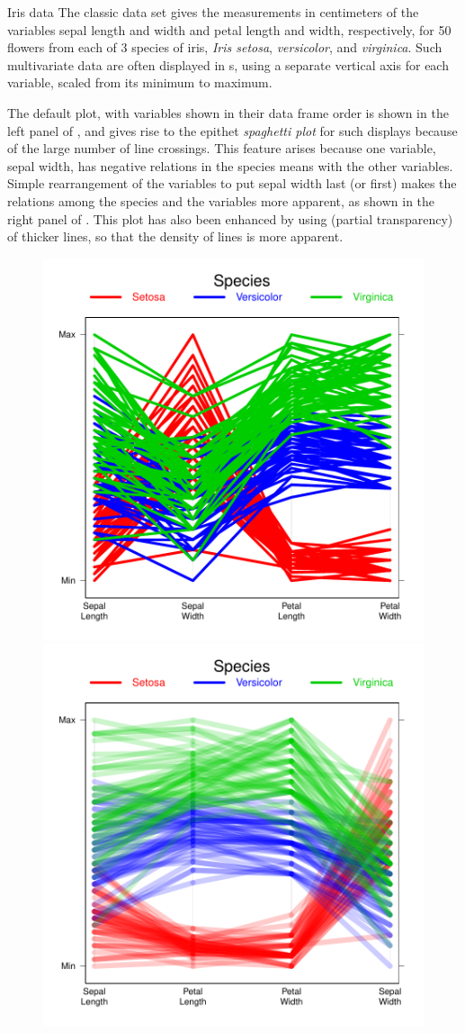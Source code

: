 \documentclass[10pt,krantz2]{krantz}\usepackage[]{graphicx}\usepackage[]{color}
\newenvironment{knitrout}{}{} %
\renewenvironment{knitrout}{\small\renewcommand{\baselinestretch}{.85}}{} %
\begin{document}
\begin{Example}{Iris data}
The classic  data set \citep{Anderson:35,Fisher:36}
gives the measurements in centimeters of the variables sepal length and width and petal length and width, respectively, for 50 flowers from each of 3 species of iris, \emph{Iris setosa}, \emph{versicolor}, and \emph{virginica}.
Such multivariate data are often displayed in s, using a separate vertical axis for
each variable, scaled from its minimum to maximum.

The default plot, with variables shown in their data frame order is shown in the left panel of ,
and gives rise to the epithet \emph{spaghetti plot} for such displays because of the large number of line crossings.
This feature arises because one variable, sepal width, has negative relations in the species means with the other
variables. Simple rearrangement of the variables to put sepal width last (or first)
makes the relations among the species and the variables more apparent, as shown in the right panel of .  This plot has also been enhanced by using  (partial transparency) of thicker
lines, so that the density of lines is more apparent.

\begin{knitrout}
\color{fgcolor}\begin{figure}[!htbp]

\centerline{\includegraphics[width=.49\textwidth]{ch01/fig/iris-parallel-1} 
\includegraphics[width=.49\textwidth]{ch01/fig/iris-parallel-2} }


\end{figure}
\end{knitrout}
\end{Example}
\end{document}
